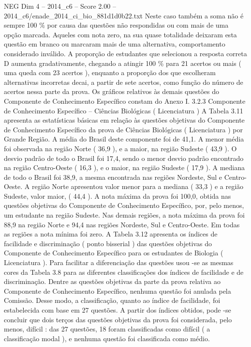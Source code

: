 \begin{textsample}{NEG Dim 4 – 2014\_c6 – Score 2.00 – 2014\_c6/enade\_2014\_ci\_bio\_881d1d0b22.txt}
Neste caso também a soma não é sempre 100 \% por causa das questões não respondidas ou com mais de uma opção marcada.
Aqueles com nota zero, na sua quase totalidade deixaram esta questão em branco ou marcaram mais de uma alternativa, comportamento considerado inválido.
A proporção de estudantes que selecionou a resposta correta D aumenta gradativamente, chegando a atingir 100 \% para 21 acertos ou mais ( uma queda com 23 acertos ), enquanto a proporção dos que escolheram alternativas incorretas decai, a partir de sete acertos, como função do número de acertos nessa parte da prova.
Os gráficos relativos às demais questões do Componente de Conhecimento Específico constam do Anexo I. 3.2.3 Componente de Conhecimento Específico – Ciências Biológicas ( Licenciatura ) A Tabela 3.11 apresenta as estatísticas básicas em relação às questões objetivas do Componente de Conhecimento Específico da prova de Ciências Biológicas ( Licenciatura ) por Grande Região.
A média do Brasil deste componente foi de 41,1.
A menor média foi observada na região Norte ( 36,9 ), e a maior, na região Sudeste ( 43,9 ).
O desvio padrão de todo o Brasil foi 17,4, sendo o menor desvio padrão encontrado na região Centro-Oeste ( 16,3 ), e o maior, na região Sudeste ( 17,9 ).
A mediana de todo o Brasil foi 38,9, a mesma encontrada nas regiões Nordeste, Sul e Centro-Oeste.
A região Norte apresentou valor menor para a mediana ( 33,3 ) e a região Sudeste, valor maior, ( 44,4 ).
A nota máxima da prova foi 100,0, obtida nas questões objetivas do Componente de Conhecimento Específico, por, pelo menos, um estudante na região Sudeste.
Nas demais regiões, a nota máxima da prova foi 88,9 na região Norte e 94,4 nas regiões Nordeste, Sul e Centro-Oeste.
Em todas as regiões a nota mínima foi zero.
A Tabela 3.12 apresenta os índices de facilidade e discriminação ( ponto bisserial ) das questões objetivas do Componente de Conhecimento Específico para os estudantes de Biologia ( Licenciatura ).
Para facilitar a diferenciação das questões usou -se as mesmas cores da Tabela 3.8 para as diferentes classificações dos índices de facilidade e de discriminação.
Dentre as questões objetivas da parte da prova relativa ao Componente de Conhecimento Específico, nenhuma questão foi anulada pela Comissão.
Desse modo, a classificação, quanto ao índice de facilidade, foi estabelecida com base em 27 questões.
A partir dos índices obtidos, pode -se concluir que dois terços das questões objetivas da prova foi considerada, pelo menos, difícil : das 27 questões, 18 foram classificadas como difícil ( a classificação modal ), e nenhuma questão foi classificada como médio.

\end{textsample}
